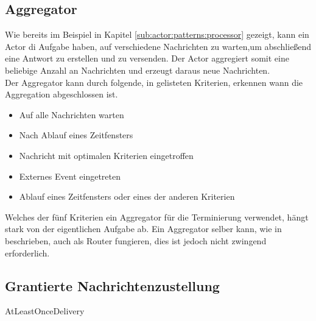 \subsection{Aggregator}\label{sec:actor:patterns:aggregator}
Wie bereits im Beispiel in Kapitel \ref{sub:actor:patterns:processor} gezeigt, kann ein Actor di Aufgabe haben, auf verschiedene Nachrichten zu warten,um abschließend eine Antwort zu erstellen und zu versenden. Der Actor aggregiert somit eine beliebige Anzahl an Nachrichten und erzeugt daraus neue Nachrichten. \\
Der Aggregator kann durch folgende, in \cite{Vernon2015ReactiveAkka} gelisteten Kriterien, erkennen wann die Aggregation abgeschlossen ist.
\begin{itemize}
    \item Auf alle Nachrichten warten
    \item Nach Ablauf eines Zeitfensters
    \item Nachricht mit optimalen Kriterien eingetroffen
    \item Externes Event eingetreten
    \item Ablauf eines Zeitfensters oder eines der anderen Kriterien
\end{itemize}
Welches der fünf Kriterien ein Aggregator für die Terminierung verwendet, hängt stark von der eigentlichen Aufgabe ab. Ein Aggregator selber kann, wie in \cite{Vernon2015ReactiveAkka} beschrieben, auch als Router fungieren, dies ist jedoch nicht zwingend erforderlich.

\subsection{Grantierte Nachrichtenzustellung}
AtLeastOnceDelivery




 